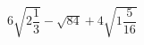 \begin{ex}[type=expression]
	\begin{condition}
		\( 6\sqrt{2\dfrac{1}{3}}-\sqrt{84}+4\sqrt{1\dfrac{5}{16}} \)
	\end{condition}
\end{ex}